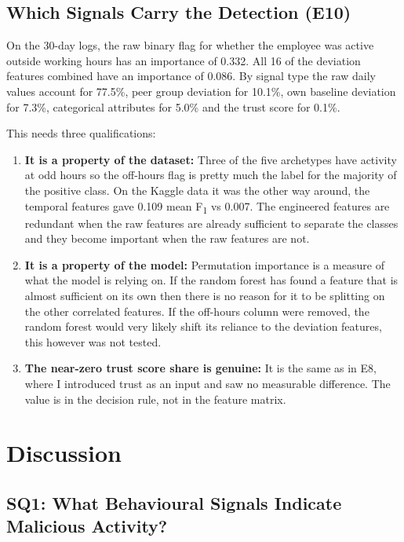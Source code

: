 \documentclass[a4paper,12pt]{article}
\newcommand{\resultinput}[1]{{\let\small\footnotesize\setlength{\tabcolsep}{4pt}}}
\begin{document}
\subsection{Which Signals Carry the Detection (E10)}
\label{sec:8.8}

\resultinput{tables/signalImportance}

On the 30-day logs, the raw binary flag for whether the employee was active outside working hours has an importance of 0.332. All 16 of the deviation features combined have an importance of 0.086. By signal type the raw daily values account for 77.5\%, peer group deviation for 10.1\%, own baseline deviation for 7.3\%, categorical attributes for 5.0\% and the trust score for 0.1\%.

This needs three qualifications:

\begin{enumerate}
  \item \textbf{It is a property of the dataset:} Three of the five archetypes have activity at odd hours so the off-hours flag is pretty much the label for the majority of the positive class. On the Kaggle data it was the other way around, the temporal features gave 0.109 mean F\textsubscript{1} vs 0.007. The engineered features are redundant when the raw features are already sufficient to separate the classes and they become important when the raw features are not.
  \item \textbf{It is a property of the model:} Permutation importance is a measure of what the model is relying on. If the random forest has found a feature that is almost sufficient on its own then there is no reason for it to be splitting on the other correlated features. If the off-hours column were removed, the random forest would very likely shift its reliance to the deviation features, this however was not tested.
  \item \textbf{The near-zero trust score share is genuine:} It is the same as in E8, where I introduced trust as an input and saw no measurable difference. The value is in the decision rule, not in the feature matrix.
\end{enumerate}
\section{Discussion}
\label{sec:9}

\subsection{SQ1: What Behavioural Signals Indicate Malicious Activity?}
\label{sec:9.1}
\end{document}
